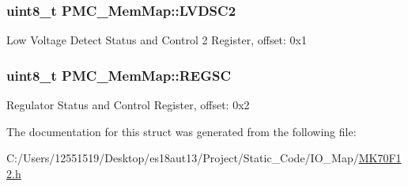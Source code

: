 \subsubsection[{L\+V\+D\+S\+C2}]{\setlength{\rightskip}{0pt plus 5cm}uint8\+\_\+t P\+M\+C\+\_\+\+Mem\+Map\+::\+L\+V\+D\+S\+C2}\label{struct_p_m_c___mem_map_a934db8b39dae8b99a9a9165df50145f5}
Low Voltage Detect Status and Control 2 Register, offset\+: 0x1 \hypertarget{struct_p_m_c___mem_map_aa14a55a46cc237589d6c01ebf7676c2a}{}
\subsubsection[{R\+E\+G\+S\+C}]{\setlength{\rightskip}{0pt plus 5cm}uint8\+\_\+t P\+M\+C\+\_\+\+Mem\+Map\+::\+R\+E\+G\+S\+C}\label{struct_p_m_c___mem_map_aa14a55a46cc237589d6c01ebf7676c2a}
Regulator Status and Control Register, offset\+: 0x2 

The documentation for this struct was generated from the following file\+:\begin{DoxyCompactItemize}
\item 
C\+:/\+Users/12551519/\+Desktop/es18aut13/\+Project/\+Static\+\_\+\+Code/\+I\+O\+\_\+\+Map/\hyperlink{_m_k70_f12_8h}{M\+K70\+F12.\+h}\end{DoxyCompactItemize}
